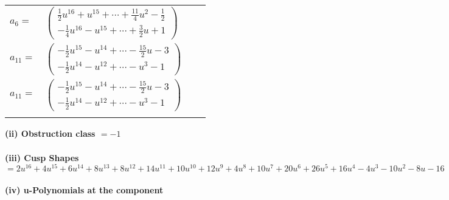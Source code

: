 \documentclass[1p]{elsarticle_modified}
\theoremstyle{definition}
\begin{document}
\begin{tabular}{m{7pt} m{180pt} m{7pt} m{180pt} }
\flushright $a_{6}=$&$\begin{pmatrix}\frac{1}{2} u^{16}+u^{15}+\cdots+\frac{11}{4} u^2-\frac{1}{2}\\-\frac{1}{4} u^{16}- u^{15}+\cdots+\frac{3}{2} u+1\end{pmatrix}$ \\
\flushright $a_{11}=$&$\begin{pmatrix}-\frac{1}{2} u^{15}- u^{14}+\cdots-\frac{15}{2} u-3\\-\frac{1}{2} u^{14}- u^{12}+\cdots- u^3-1\end{pmatrix}$\\ \flushright $a_{11}=$&$\begin{pmatrix}-\frac{1}{2} u^{15}- u^{14}+\cdots-\frac{15}{2} u-3\\-\frac{1}{2} u^{14}- u^{12}+\cdots- u^3-1\end{pmatrix}$\\&\end{tabular}
\flushleft \textbf{(ii) Obstruction class $= -1$}\\~\\
\flushleft \textbf{(iii) Cusp Shapes $= 2 u^{16}+4 u^{15}+6 u^{14}+8 u^{13}+8 u^{12}+14 u^{11}+10 u^{10}+12 u^9+4 u^8+10 u^7+20 u^6+26 u^5+16 u^4-4 u^3-10 u^2-8 u-16$}\\~\\
\newpage\renewcommand{\arraystretch}{1}
\flushleft \textbf{(iv) u-Polynomials at the component}\newline \\
\end{document}
